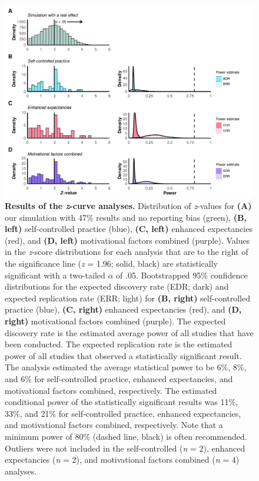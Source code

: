 \documentclass[
  doc, donotrepeattitle,floatsintext]{apa7}
\begin{document}
\clearpage

\begin{figure}

{\centering \includegraphics{../../figs/fig2} 

}

\caption{\normalfont \small \textbf{Results of the \emph{z}-curve analyses.} Distribution of \emph{z}-values for \textbf{(A)} our simulation with 47\% results and no reporting bias (green), \textbf{(B, left)} self-controlled practice (blue), \textbf{(C, left)} enhanced expectancies (red), and \textbf{(D, left)} motivational factors combined (purple). Values in the \emph{z}-score distributions for each analysis that are to the right of the significance line (\emph{z} = 1.96; solid, black) are statistically significant with a two-tailed \(\alpha\) of .05. Bootstrapped 95\% confidence distributions for the expected discovery rate (EDR; dark) and expected replication rate (ERR; light) for \textbf{(B, right)} self-controlled practice (blue), \textbf{(C, right)} enhanced expectancies (red), and \textbf{(D, right)} motivational factors combined (purple). The expected discovery rate is the estimated average power of all studies that have been conducted. The expected replication rate is the estimated power of all studies that observed a statistically significant result. The analysis estimated the average statistical power to be 6\%, 8\%, and 6\% for self-controlled practice, enhanced expectancies, and motivational factors combined, respectively. The estimated conditional power of the statistically significant results was 11\%, 33\%, and 21\% for self-controlled practice, enhanced expectancies, and motivational factors combined, respectively. Note that a minimum power of 80\% (dashed line, black) is often recommended. Outliers were not included in the self-controlled (\emph{n} = 2), enhanced expectancies (\emph{n} = 2), and motivational factors combined (\emph{n} = 4) analyses.}\label{fig:fig2}
\end{figure}
\end{document}
